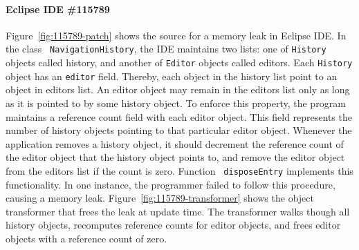 \paragraph{Eclipse IDE \#115789} Figure~\ref{fig:115789-patch} shows the
source for a memory leak in Eclipse IDE. In the class {\tt
NavigationHistory}, the IDE maintains two lists: one of {\tt History}
objects called history, and another of {\tt Editor} objects called editors.
Each {\tt History} object has an {\tt editor} field. Thereby, each object in the
history list point to an object in editors list. An editor object may remain
in the editors list only as long as it is pointed to by some history
object. To enforce this property, the program maintains a reference count
field with each editor object. This field represents the number of history
objects pointing to that particular editor object. Whenever the
application removes a history object, it should decrement the reference
count of the editor object that the history object points to, and remove
the editor object from the editors list if the count is zero. Function {\tt
disposeEntry} implements this functionality. In one instance, the
programmer failed to follow this procedure, causing a memory
leak. Figure~\ref{fig:115789-transformer} shows the object transformer that frees
the leak at update time. The transformer walks though all history objects,
recomputes reference counts for editor objects, and frees editor objects
with a reference count of zero.
